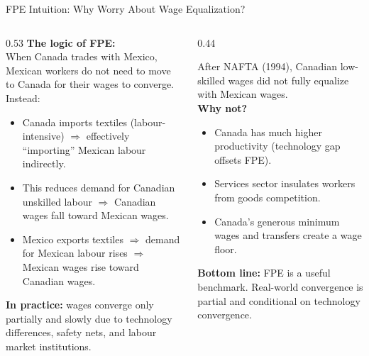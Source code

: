 \documentclass[aspectratio=169]{beamer}
\begin{document}
\begin{frame}[shrink=8]{FPE Intuition: Why Worry About Wage Equalization?}
\begin{columns}[T]
\begin{column}{0.53\textwidth}
\textbf{The logic of FPE:}\\[0.2em]
When Canada trades with Mexico, Mexican workers
do not need to move to Canada for their wages to
converge. Instead:
\begin{itemize}\small
  \item Canada imports textiles (labour-intensive)
        $\Rightarrow$ effectively ``importing'' Mexican
        labour indirectly.
  \item This reduces demand for Canadian unskilled
        labour $\Rightarrow$ Canadian wages fall toward
        Mexican wages.
  \item Mexico exports textiles $\Rightarrow$ demand
        for Mexican labour rises $\Rightarrow$ Mexican
        wages rise toward Canadian wages.
\end{itemize}
\vspace{0.3em}
\textbf{In practice:} wages converge only partially
and slowly due to technology differences, safety nets,
and labour market institutions.
\end{column}
\begin{column}{0.44\textwidth}
\begin{canadex}
\small
After NAFTA (1994), Canadian low-skilled wages
did not fully equalize with Mexican wages.\\[0.3em]
\textbf{Why not?}
\begin{itemize}
  \item Canada has much higher productivity (technology
        gap offsets FPE).
  \item Services sector insulates workers from goods
        competition.
  \item Canada's generous minimum wages and transfers
        create a wage floor.
\end{itemize}
\textbf{Bottom line:} FPE is a useful benchmark.
Real-world convergence is partial and conditional
on technology convergence.
\end{canadex}
\end{column}
\end{columns}
\end{frame}
\end{document}
